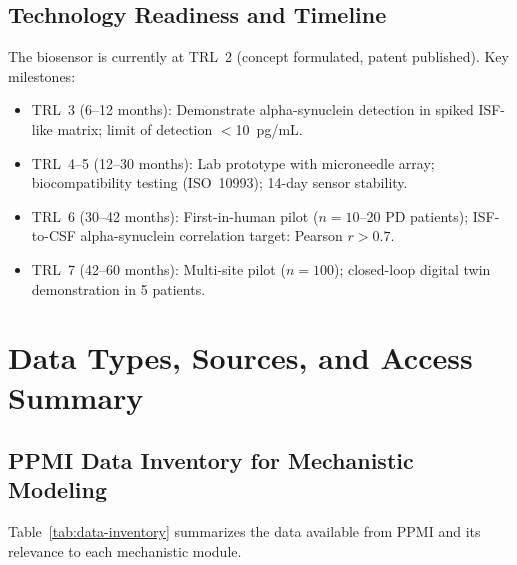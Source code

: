 \subsection{Technology Readiness and Timeline}

The biosensor is currently at TRL~2 (concept formulated, patent published). Key milestones:

\begin{itemize}
\item TRL~3 (6--12 months): Demonstrate alpha-synuclein detection in spiked ISF-like matrix; limit of detection $<$10~pg/mL.
\item TRL~4--5 (12--30 months): Lab prototype with microneedle array; biocompatibility testing (ISO~10993); 14-day sensor stability.
\item TRL~6 (30--42 months): First-in-human pilot ($n = 10$--20 PD patients); ISF-to-CSF alpha-synuclein correlation target: Pearson $r > 0.7$.
\item TRL~7 (42--60 months): Multi-site pilot ($n = 100$); closed-loop digital twin demonstration in 5 patients.
\end{itemize}


\section{Data Types, Sources, and Access Summary}
\label{sec:mech-data}

\subsection{PPMI Data Inventory for Mechanistic Modeling}

Table~\ref{tab:data-inventory} summarizes the data available from PPMI and its relevance to each mechanistic module.

